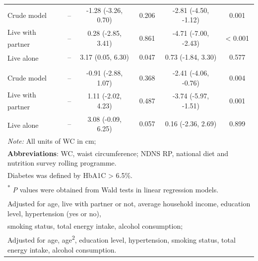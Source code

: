 \begin{table}[H]
\begin{tabular}[t]{lccccc}
		\hspace{1em}\hspace{1em}Crude model & -- & -1.28 (-3.26, 0.70) & 0.206 & -2.81 (-4.50, -1.12) & 0.001\\
		\hspace{1em}\hspace{1em}Live with partner\textsuperscript{\ddag} & -- & 0.28 (-2.85, 3.41) & 0.861 & -4.71 (-7.00, -2.43) & < 0.001\\
		\hspace{1em}\hspace{1em}Live alone\textsuperscript{\ddag} & -- & 3.17 (0.05, 6.30) & 0.047 & 0.73 (-1.84, 3.30) & 0.577\\
		\addlinespace[0.3em]
		\multicolumn{6}{l}{\hspace{1em}\textbf{WC in non-diabetics}}\\
		\hspace{1em}\hspace{1em}Crude model & -- & -0.91 (-2.88, 1.07) & 0.368 & -2.41 (-4.06, -0.76) & 0.004\\
		\hspace{1em}\hspace{1em}Live with partner\textsuperscript{\ddag} & -- & 1.11 (-2.02, 4.23) & 0.487 & -3.74 (-5.97, -1.51) & 0.001\\
		\hspace{1em}\hspace{1em}Live alone\textsuperscript{\ddag} & -- & 3.08 (-0.09, 6.25) & 0.057 & 0.16 (-2.36, 2.69) & 0.899\\
		\bottomrule
		\multicolumn{6}{l}{{\scriptsize \textit{Note: }} All units of WC in cm;}\\
		\multicolumn{6}{l}{{\scriptsize \textbf{Abbreviations}: WC, waist circumference; NDNS RP, national diet and nutrition survey rolling programme.}}\\
		\multicolumn{6}{l}{{\scriptsize Diabetes was defined by HbA1C > 6.5\%. }}\\
		\multicolumn{6}{l}{{\scriptsize \textsuperscript{*} \textit{P} values were obtained from Wald tests in linear regression models.}}\\
		\multicolumn{6}{l}{{\scriptsize \textsuperscript{\dag} Adjusted for age, live with partner or not, average household income, education level, hypertension (yes or no),}}\\
		\multicolumn{6}{l}{{\scriptsize smoking status, total energy intake, alcohol consumption;}}\\
		\multicolumn{6}{l}{{\scriptsize \textsuperscript{\ddag} Adjusted for age, age\textsuperscript{2}, education level, hypertension, smoking status, total energy intake, alcohol consumption.}}\\
	\end{tabular}
\end{table}
\vspace{-0.3cm}


